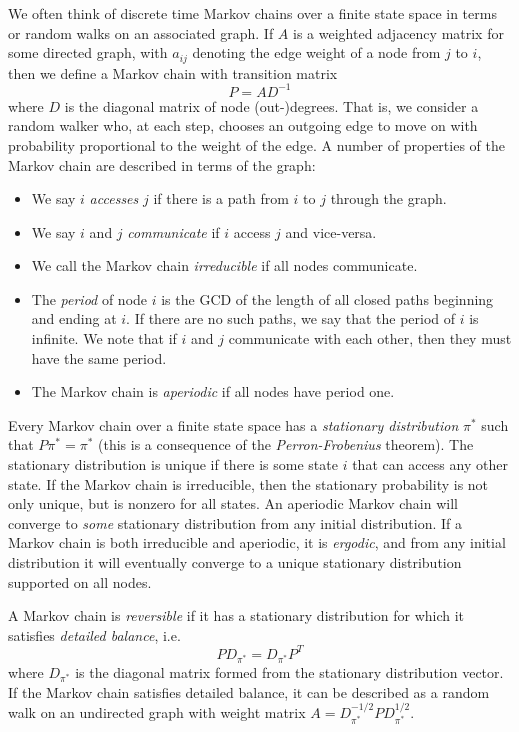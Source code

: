 \documentclass[12pt, leqno]{article} %
\begin{document}
We often think of discrete time Markov chains over a finite state
space in terms or random walks on an associated graph.
If $A$ is a weighted adjacency matrix for some directed graph,
with $a_{ij}$ denoting the edge weight of a node from $j$ to $i$,
then we define a Markov chain with transition matrix
\[
  P = AD^{-1}
\]
where $D$ is the diagonal matrix of node (out-)degrees.  That is,
we consider a random walker who, at each step, chooses an outgoing
edge to move on with probability proportional to the weight of the edge.
A number of properties of the Markov chain are described in terms
of the graph:
\begin{itemize}
\item
  We say $i$ {\em accesses} $j$ if there is a path from $i$ to $j$
  through the graph.
\item
  We say $i$ and $j$ {\em communicate} if $i$ access $j$ and
  vice-versa.
\item
  We call the Markov chain {\em irreducible} if all nodes communicate.
\item
  The {\em period} of node $i$ is the GCD of the length of all closed
  paths beginning and ending at $i$.  If there are no such paths, we
  say that the period of $i$ is infinite.  We note that if
  $i$ and $j$ communicate with each other, then they must have the
  same period.
\item
  The Markov chain is {\em aperiodic} if all nodes have period one.
\end{itemize}
Every Markov chain over a finite state space has a {\em stationary
  distribution} $\pi^*$ such that $P \pi^* = \pi^*$ (this is a
consequence of the {\em Perron-Frobenius} theorem).  The stationary
distribution is unique if there is some state $i$ that can access any
other state.  If the Markov chain is irreducible, then the stationary
probability is not only unique, but is nonzero for all states.  An
aperiodic Markov chain will converge to {\em some} stationary
distribution from any initial distribution.  If a Markov chain is both
irreducible and aperiodic, it is {\em ergodic}, and from any initial
distribution it will eventually converge to a unique stationary
distribution supported on all nodes.

A Markov chain is {\em reversible} if it has a stationary
distribution for which it satisfies {\em detailed balance}, i.e.
\[
  P D_{\pi^*} = D_{\pi^*} P^T
\]
where $D_{\pi^*}$ is the diagonal matrix formed from the stationary
distribution vector.
If the Markov chain satisfies detailed balance, it can be described as
a random walk on an undirected graph with weight matrix
$A = D_{\pi^*}^{-1/2} P D_{\pi^*}^{1/2}$.
\end{document}

